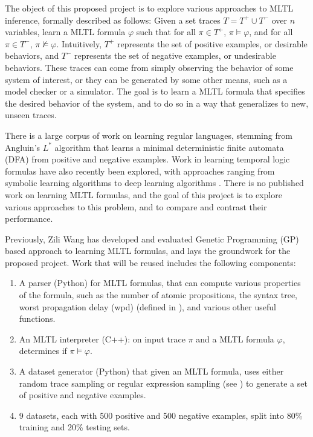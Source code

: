 \documentclass[12pt]{article}
\renewcommand{\phi}{\varphi}
\begin{document}
The object of this proposed project is to explore various approaches to MLTL inference, formally described as follows: 
Given a set traces $T = T^+ \cup T^-$ over $n$ variables, learn a MLTL formula $\phi$ such that for all $\pi \in T^+$, $\pi \models \phi$, and for all $\pi \in T^-$, $\pi \not\models \phi$. 
Intuitively, $T^+$ represents the set of positive examples, or desirable behaviors, and $T^-$ represents the set of negative examples, or undesirable behaviors.
These traces can come from simply observing the behavior of some system of interest, or they can be generated by some other means, such as a model checker or a simulator.
The goal is to learn a MLTL formula that specifies the desired behavior of the system, and to do so in a way that generalizes to new, unseen traces.

There is a large corpus of work on learning regular languages, stemming from Angluin's $L^*$ algorithm \cite{ANGLUIN_Lstar} that learns a minimal deterministic finite automata (DFA) from positive and negative examples. Work in learning temporal logic formulas have also recently been explored, with approaches ranging from symbolic learning algorithms \cite{roy_ltlf_learning, camacho_ltlf_learning} to deep learning algorithms \cite{stl_learning, Luo_Liang_Du_Wan_Peng_Zhang_2022}.
There is no published work on learning MLTL formulas, and the goal of this project is to explore various approaches to this problem, and to compare and contrast their performance.

Previously, Zili Wang has developed and evaluated Genetic Programming (GP) based approach to learning MLTL formulas, and lays the groundwork for the proposed project.
Work that will be reused includes the following components:
\begin{enumerate}
  \item A parser (Python) for MLTL formulas, that can compute various properties of the formula, such as the number of atomic propositions, the syntax tree, worst propagation delay (wpd) (defined in \cite{KZJZR20}), and various other useful functions.  
  \item An MLTL interpreter (C++): on input trace $\pi$ and a MLTL formula $\phi$, determines if $\pi \models \phi$.
  \item A dataset generator (Python) that given an MLTL formula, uses either random trace sampling or regular expression sampling (see \cite{WEST-iFM23}) to generate a set of positive and negative examples.
  \item 9 datasets, each with 500 positive and 500 negative examples, split into 80\% training and 20\% testing sets.
\end{enumerate}
\end{document}
